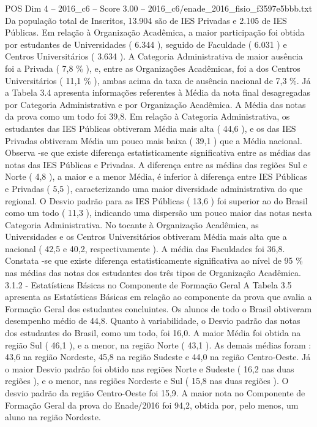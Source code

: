 \begin{textsample}{POS Dim 4 – 2016\_c6 – Score 3.00 – 2016\_c6/enade\_2016\_fisio\_f3597e5bbb.txt}
Da população total de Inscritos, 13.904 são de IES Privadas e 2.105 de IES Públicas.
Em relação à Organização Acadêmica, a maior participação foi obtida por estudantes de Universidades ( 6.344 ), seguido de Faculdade ( 6.031 ) e Centros Universitários ( 3.634 ).
A Categoria Administrativa de maior ausência foi a Privada ( 7,8 \% ), e, entre as Organizações Acadêmicas, foi a dos Centros Universitários ( 11,1 \% ), ambas acima da taxa de ausência nacional de 7,3 \%.
Já a Tabela 3.4 apresenta informações referentes à Média da nota final desagregadas por Categoria Administrativa e por Organização Acadêmica.
A Média das notas da prova como um todo foi 39,8.
Em relação à Categoria Administrativa, os estudantes das IES Públicas obtiveram Média mais alta ( 44,6 ), e os das IES Privadas obtiveram Média um pouco mais baixa ( 39,1 ) que a Média nacional.
Observa -se que existe diferença estatisticamente significativa entre as médias das notas das IES Públicas e Privadas.
A diferença entre as médias das regiões Sul e Norte ( 4,8 ), a maior e a menor Média, é inferior à diferença entre IES Públicas e Privadas ( 5,5 ), caracterizando uma maior diversidade administrativa do que regional.
O Desvio padrão para as IES Públicas ( 13,6 ) foi superior ao do Brasil como um todo ( 11,3 ), indicando uma dispersão um pouco maior das notas nesta Categoria Administrativa.
No tocante à Organização Acadêmica, as Universidades e os Centros Universitários obtiveram Média mais alta que a nacional ( 42,5 e 40,2, respectivamente ).
A média das Faculdades foi 36,8.
Constata -se que existe diferença estatisticamente significativa ao nível de 95 \% nas médias das notas dos estudantes dos três tipos de Organização Acadêmica. 3.1.2 - Estatísticas Básicas no Componente de Formação Geral A Tabela 3.5 apresenta as Estatísticas Básicas em relação ao componente da prova que avalia a Formação Geral dos estudantes concluintes.
Os alunos de todo o Brasil obtiveram desempenho médio de 44,8.
Quanto à variabilidade, o Desvio padrão das notas dos estudantes do Brasil, como um todo, foi 16,0.
A maior Média foi obtida na região Sul ( 46,1 ), e a menor, na região Norte ( 43,1 ).
As demais médias foram : 43,6 na região Nordeste, 45,8 na região Sudeste e 44,0 na região Centro-Oeste.
Já o maior Desvio padrão foi obtido nas regiões Norte e Sudeste ( 16,2 nas duas regiões ), e o menor, nas regiões Nordeste e Sul ( 15,8 nas duas regiões ).
O desvio padrão da região Centro-Oeste foi 15,9.
A maior nota no Componente de Formação Geral da prova do Enade/2016 foi 94,2, obtida por, pelo menos, um aluno na região Nordeste.

\end{textsample}
